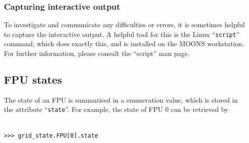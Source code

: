 \documentclass[11pt,a4paper]{report}
\begin{document}
\subsubsection*{Capturing interactive output}
  To
investigate and communicate any difficulties or errors, it is
sometimes helpful to capture the interactive output. A helpful tool
for this is the Linux ``\texttt{script}'' command, which does exactly
this, and is installed on the MOONS workstation.  For further
information, please consult the ``script'' man page.



\subsection{FPU states}
  
 
 The state of an
FPU is summarised in a enumeration value, which is stored in the
attribute ``\texttt{state}''. For example, the state of FPU 0 can be
retrieved by

\begin{verbatim}

>>> grid_state.FPU[0].state
\end{verbatim}
\end{document}
